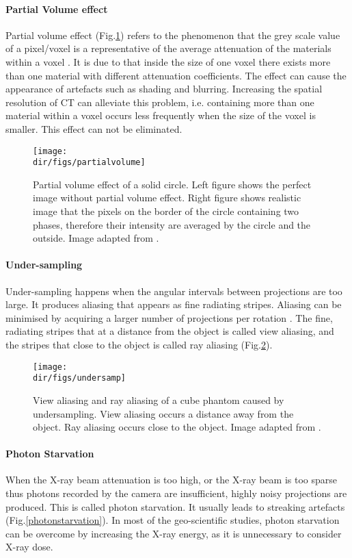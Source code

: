 \paragraph{Partial Volume effect}
Partial volume effect (Fig.\ref{pve}) refers to the phenomenon that the grey scale value of a pixel/voxel is a representative of the average attenuation of the materials within a voxel \citep{barrett2004artifacts}. It is due to that inside the size of one voxel there exists more than one material with different attenuation coefficients. The effect can cause the appearance of artefacts such as shading and blurring. Increasing the spatial resolution of CT can alleviate this problem, i.e. containing more than one material within a voxel occurs less frequently when the size of the voxel is smaller. This effect can not be eliminated.

\begin{figure}
    \centering
    \texttt{[image: \\dir/figs/partialvolume]}
    \caption{Partial volume effect of a solid circle. Left figure shows the perfect image without partial volume effect. Right figure shows realistic image that the pixels on the border of the circle containing two phases, therefore their intensity are averaged by the circle and the outside. Image adapted from \citep{CTscanartefacts}.}
    \label{pve}
\end{figure}

\paragraph{Under-sampling} 
Under-sampling happens when the angular intervals between projections are too large. It produces aliasing that appears as fine radiating stripes. Aliasing can be minimised by acquiring a larger number of projections per rotation \citep{barrett2004artifacts}. The fine, radiating stripes that at a distance from the object is called view aliasing, and the stripes that close to the object is called ray aliasing (Fig.\ref{undersamp}).

\begin{figure}
    \centering
    \texttt{[image: \\dir/figs/undersamp]}
    \caption{View aliasing and ray aliasing of a cube phantom caused by undersampling. View aliasing occurs a distance away from the object. Ray aliasing occurs close to the object. Image adapted from \citep{CTartifacts}.}
    \label{undersamp}
\end{figure}

\paragraph{Photon Starvation} 
When the X-ray beam attenuation is too high, or the X-ray beam is too sparse thus photons recorded by the camera are insufficient, highly noisy projections are produced. This is called photon starvation. It usually leads to streaking artefacts \citep{barrett2004artifacts} (Fig.\ref{photonstarvation}). In most of the geo-scientific studies, photon starvation can be overcome by increasing the X-ray energy, as it is unnecessary to consider X-ray dose.

